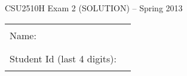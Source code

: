 \documentclass[12pt]{article}                   %
\begin{document}
\vspace*{-1.5cm}
\centerline{\Large CSU2510H Exam 2 \ifrubric (SOLUTION) \fi-- Spring 2013}

\vspace{0.5cm}

\ifrubric\relax\else
\begin{center}
\begin{tabular}{l@{\qquad}l}
Name:                        & \rule{174pt}{1pt} \\[.5cm]
Student Id (last 4 digits):  & \rule{174pt}{1pt} \\[.5cm]
\end{tabular}
\end{center}
\fi
\end{document}

